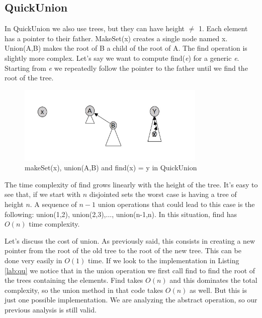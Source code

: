 \documentclass{article}
\begin{document}
\subsection{QuickUnion} \label{QU}
In QuickUnion we also use trees, but they can have height $\neq$ 1. Each element has a pointer to their
father. MakeSet(x) creates a single node named x. Union(A,B) makes the root of B a child of the 
root of A. The find operation is slightly more complex. Let's say
we want to compute find(\emph{e}) for a generic \emph{e}. Starting from \emph{e} we repeatedly 
follow the pointer to the father until we find the root of the tree.
\begin{figure}[h!]
    \centering
    \includegraphics[width=0.8\textwidth]  {img/uf.jpg}
    \caption{makeSet(x), union(A,B) and find(x) = y in QuickUnion}
    \label{fig:quickUnion}
\end{figure}

The time complexity of find grows linearly with the height of the tree. It's easy to see
that, if we start with $n$ disjointed sets the worst case is having a tree of height $n$. A sequence
of $n-1$ union operations that could lead to this case is the following: union(1,2), union(2,3),..., union(n-1,n).
In this situation, find has $O(n)$ time complexity. 
\begin{center}
     
\end{center}
Let's discuss the cost of union. As previously said,
this consists in creating a new pointer from the root of the old tree to the root of the new tree. This can be done 
very easily in $O(1)$ time. If we look to the implementation in Listing \ref{lab:qu} we notice
that in the union operation we first call find to find the root of the trees containing the elements. Find takes $O(n)$ and this dominates the 
total complexity, so the union method in that code takes $ O(n)$ as well. But this is just one possible implementation. We are analyzing
the abstract operation, so our previous analysis is still valid. 
\end{document}
